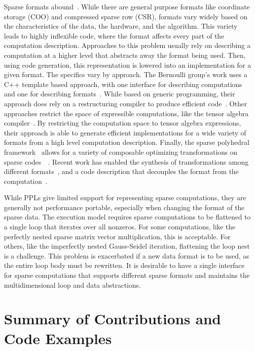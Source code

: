 Sparse formats abound~\cite{langr2015evaluation}. 
While there are general purpose formats like coordinate storage (COO) and compressed sparse row (CSR), formats vary widely based on the characteristics of the data, the hardware, and the algorithm.
This variety leads to highly inflexible code, where the format affects every part of the computation description.
Approaches to this problem usually rely on describing a computation at a higher level that abstracts away the format being used.
Then, using code generation, this representation is lowered into an implementation for a given format.
The specifics vary by approach.
The Bernoulli group's work uses a C++ template based approach, with one interface for describing computations~\cite{kotlyar1997relational} and one for describing formats~\cite{kotlyar1997compiling}.
While based on generic programming, their approach does rely on a restructuring compiler to produce efficient code~\cite{mateev2000bernoulli,ahmed2000framework}.
Other approaches restrict the space of expressible computations, like the tensor algebra compiler~\cite{kjolstad2017tensor}.
By restricting the computation space to tensor algebra expressions, their approach is able to generate efficient implementations for a wide variety of formats from a high level computation description.
Finally, the sparse polyhedral framework~\cite{strout2016approach} allows for a variety of composable optimizing transformations on sparse codes~~\cite{ahmad2017optimizing}.
Recent work has enabled the synthesis of transformations among different formats~\cite{popoola2023code}, and a code description that decouples the format from the computation~\cite{zhao2022polyhedral}.

While PPLs give limited support for representing sparse computations, they are generally not performance portable, especially when changing the format of the sparse data.
The execution model requires sparse computations to be flattened to a single loop that iterates over all nonzeros. 
For some computations, like the perfectly nested sparse matrix vector multiplication, this is acceptable.
For others, like the imperfectly nested Gauss-Seidel iteration, flattening the loop nest is a challenge.
This problem is exacerbated if a new data format is to be used, as the entire loop body must be rewritten.
It is desirable to have a single interface for sparse computations that supports different sparse formats and maintains the multidimensional loop and data abstractions.

\section{Summary of Contributions and Code Examples}

